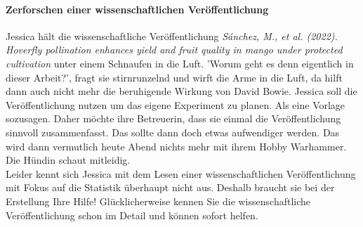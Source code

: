 \documentclass[a4paper, 9pt]{scrartcl}\usepackage[]{graphicx}\usepackage[]{xcolor}
\begin{document}
\paragraph{Zerforschen einer wissenschaftlichen Veröffentlichung}
\fi

Jessica hält die wissenschaftliche Veröffentlichung \textit{Sánchez, M., et al. (2022). Hoverfly pollination enhances yield and fruit quality in mango under protected cultivation} unter einem Schnaufen in die Luft. 'Worum geht es denn eigentlich in dieser Arbeit?', fragt sie stirnrunzelnd und wirft die Arme in die Luft, da hilft dann auch nicht mehr die beruhigende Wirkung von David Bowie. Jessica soll die Veröffentlichung nutzen um das eigene Experiment zu planen. Als eine Vorlage sozusagen. Daher möchte ihre Betreuerin, dass sie einmal die Veröffentlichung sinnvoll zusammenfasst. Das sollte dann doch etwas aufwendiger werden. Das wird dann vermutlich heute Abend nichts mehr mit ihrem Hobby Warhammer. Die Hündin schaut mitleidig.\\

Leider kennt sich Jessica mit dem Lesen einer wissenschaftlichen Veröffentlichung mit Fokus auf die Statistik überhaupt nicht aus. Deshalb braucht sie bei der Erstellung Ihre Hilfe! Glücklicherweise kennen Sie die wissenschaftliche Veröffentlichung schon im Detail und können sofort helfen.
\end{document}
